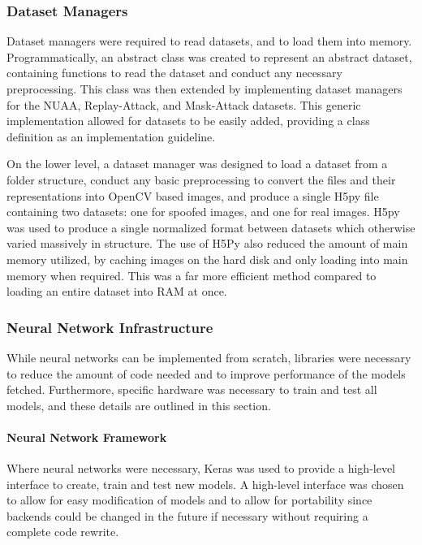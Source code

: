 \documentclass[10pt,a4paper]{article}
\begin{document}
        \subsubsection{Dataset Managers}
        Dataset managers were required to read datasets, and to load them into memory. Programmatically, an abstract class was created to represent an abstract dataset, containing functions to read the dataset and conduct any necessary preprocessing. This class was then extended by implementing dataset managers for the NUAA, Replay-Attack, and Mask-Attack datasets. This generic implementation allowed for datasets to be easily added, providing a class definition as an implementation guideline. 

        On the lower level, a dataset manager was designed to load a dataset from a folder structure, conduct any basic preprocessing to convert the files and their representations into OpenCV based images, and produce a single H5py file containing two datasets: one for spoofed images, and one for real images. H5py was used to produce a single normalized format between datasets which otherwise varied massively in structure. The use of H5Py also reduced the amount of main memory utilized, by caching images on the hard disk and only loading into main memory when required. This was a far more efficient method compared to loading an entire dataset into RAM at once.

        \subsubsection{Neural Network Infrastructure}
            While neural networks can be implemented from scratch, libraries were necessary to reduce the amount of code needed and to improve performance of the models fetched.
            Furthermore, specific hardware was necessary to train and test all models, and these details are outlined in this section.

            \paragraph{Neural Network Framework} 
            Where neural networks were necessary, Keras was used to provide a high-level interface to create, train and test new models. A high-level interface was chosen to allow for easy modification of models and to allow for portability since backends could be changed in the future if necessary without requiring a complete code rewrite.
\end{document}
